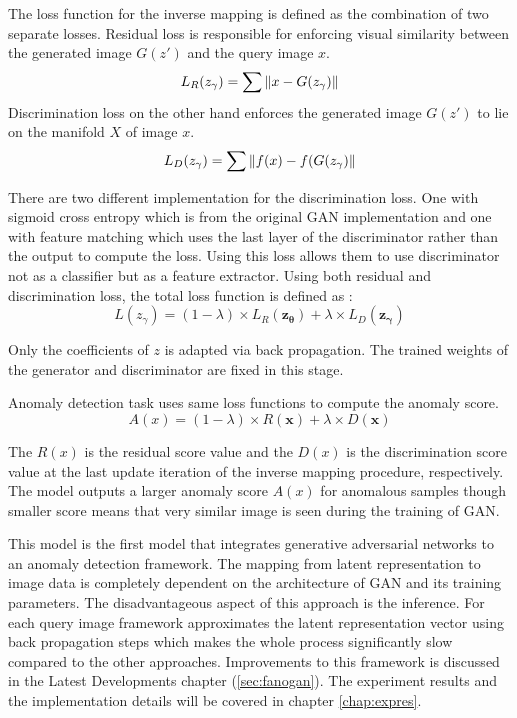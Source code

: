 The loss function for the inverse mapping is defined as the combination of two separate losses.
Residual loss is responsible for enforcing visual similarity between the generated image
$G(z\prime)$ and the query image $x$.
\begin{equation}
    \label{eqn:anogan_rl}
    L_R (z_{\gamma}) = \sum \left\lVert x - G(z_{\gamma})\right\rVert
\end{equation} 
Discrimination loss on the other hand enforces the
generated image $G(z\prime)$ to lie on the manifold $X$ of image $x$.
\begin{equation}
    \label{eqn:anogan_dl}
    L_D (z_{\gamma}) = \sum  \left\lVert f(x) - f(G(z_{\gamma})\right\rVert
\end{equation}

There are two different implementation for the discrimination loss. One with sigmoid cross entropy
which is from the original GAN implementation \cite{Goodfellow:2014:GAN:2969033.2969125} and one
with feature matching \cite{fm} which uses the last layer of the discriminator rather than the
output to compute the loss. Using this loss allows them to use discriminator not as a classifier but
as a feature extractor. Using both residual and discrimination loss, the total loss function is
defined as :
$$L(z_{\gamma}) = (1 - \lambda ) \times L_{R}(\boldsymbol{z_{\theta}}) + \lambda \times
L_{D}(\boldsymbol{z_{\gamma}})$$

Only the coefficients of $z$ is adapted via back propagation. The trained weights of the generator
and discriminator are fixed in this stage. \cite{Schlegl2017UnsupervisedAD}

Anomaly detection task uses same loss functions to compute the anomaly score. 
$$A(x) = (1 - \lambda ) \times R(\boldsymbol{x}) + \lambda \times D(\boldsymbol{x}) $$

The $R(x)$ is the residual score value and the $D(x)$ is the discrimination score value at the last
update iteration of the inverse mapping procedure, respectively. The model outputs a larger anomaly
score $A(x)$ for anomalous samples though smaller score means that very similar image is seen during
the training of GAN. 

This model is the first model that integrates generative adversarial networks to an anomaly
detection framework. The mapping from latent representation to image data is completely dependent on
the architecture of GAN and its training parameters. The disadvantageous aspect of this approach
is the inference. For each query image framework approximates the latent representation vector using
back propagation steps which makes the whole process significantly slow compared to the other
approaches. Improvements to this framework is discussed in the Latest Developments chapter
(\ref{sec:fanogan}). The experiment results and the implementation details will be covered in
chapter \ref{chap:expres}.

